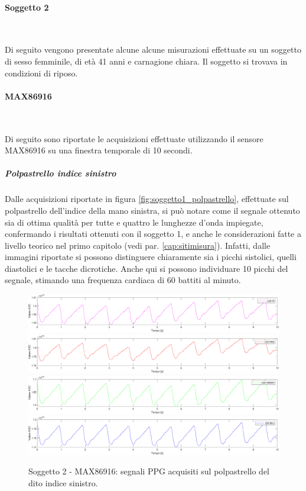 \clearpage
\paragraph{Soggetto 2}~

Di seguito vengono presentate alcune alcune misurazioni effettuate su un soggetto di sesso femminile, di età 41 anni e carnagione chiara. Il soggetto si trovava in condizioni di riposo.

\paragraph{MAX86916}~

Di seguito sono riportate le acquisizioni effettuate utilizzando il sensore MAX86916 su una finestra temporale di 10 secondi.

\subparagraph{Polpastrello indice sinistro}
Dalle acquisizioni riportate in figura \ref{fig:soggetto1_polpastrello}, effettuate sul polpastrello dell'indice della mano sinistra, si può notare come il segnale ottenuto sia di ottima qualità per tutte e quattro le lunghezze d'onda impiegate, confermando i risultati ottenuti con il soggetto 1, e anche le considerazioni fatte a livello teorico nel primo capitolo (vedi par. \ref{cap:sitimisura}). Infatti, dalle immagini riportate si possono distinguere chiaramente sia i picchi sistolici, quelli diastolici e le tacche dicrotiche. Anche qui si possono individuare 10 picchi del segnale, stimando una frequenza cardiaca di 60 battiti al minuto.
\begin{figure}[h]
	\centering
	\includegraphics[width=1\linewidth]{ImageFiles/Misure Preliminari/Soggetto 2/max86916/polpastrello_ired}
	\includegraphics[width=1\linewidth]{ImageFiles/Misure Preliminari/Soggetto 2/max86916/polpastrello_red}
	\includegraphics[width=1\linewidth]{ImageFiles/Misure Preliminari/Soggetto 2/max86916/polpastrello_green}
	\includegraphics[width=1\linewidth]{ImageFiles/Misure Preliminari/Soggetto 2/max86916/polpastrello_blu}
	\caption{Soggetto 2 - MAX86916: segnali PPG acquisiti sul polpastrello del dito indice sinistro.}
	\label{fig:soggetto2_MAX86916_polpastrello}
\end{figure}

